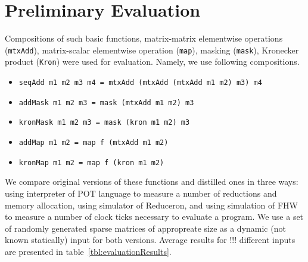 \section{Preliminary Evaluation}

Compositions of such basic functions, matrix-matrix elementwise operations (\verb|mtxAdd|), matrix-scalar elementwise operation (\verb|map|), masking (\verb|mask|), Kronecker product (\verb|Kron|) were used for evaluation.
Namely, we use following compositions.
\begin{itemize}
     \item \verb|seqAdd m1 m2 m3 m4 = mtxAdd (mtxAdd (mtxAdd m1 m2) m3) m4|
     \item \verb|addMask m1 m2 m3 = mask (mtxAdd m1 m2) m3 |  
     \item \verb|kronMask m1 m2 m3 = mask (kron m1 m2) m3 |  
     \item \verb|addMap m1 m2 = map f (mtxAdd m1 m2)|  
     \item \verb|kronMap m1 m2 = map f (kron m1 m2)|  
\end{itemize}
We compare original versions of these functions and distilled ones in three ways: using interpreter of POT language to measure a number of reductions and memory allocation, using simulator of Reduceron, and using simulation of FHW to measure a number of clock ticks necessary to evaluate a program.
We use a set of randomly generated sparse matrices of appropreate size as a dynamic (not known statically) input for both versions.
Average results for !!! different inputs are presented in table~\ref{tbl:evaluationResults}. 


